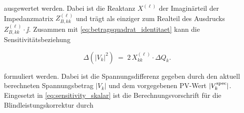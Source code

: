 ausgewertet werden. 
Dabei ist die Reaktanz $X^{(\ell)}$ der Imaginärteil der Impedanzmatrix $Z^{(\ell)}_{B,kk}$ und trägt als einziger zum Realteil des Ausdrucks $Z^{(\ell)}_{B,kk}\cdot \jj$.
Zusammen mit \eqref{eq:betragsquadrat_identitaet} kann die Sensitivitätsbeziehung 

\begin{equation}
	\Delta(|V_k|^2) \;=\; 2\,X^{(\ell)}_{kk}\cdot\Delta Q_k.
	\label{eq:sensitivity_skalar}
\end{equation}

formuliert werden.
Dabei ist die Spannungsdifferenz gegeben durch den aktuell berechneten Spannungsbetrag $|V_k|$ und dem vorgegebenen PV-Wert $|V^{\mathrm{spec}}_k|$.
Eingesetzt in \eqref{eq:sensitivity_skalar} ist die Berechnungsvorschrift für die Blindleistungskorrektur durch

